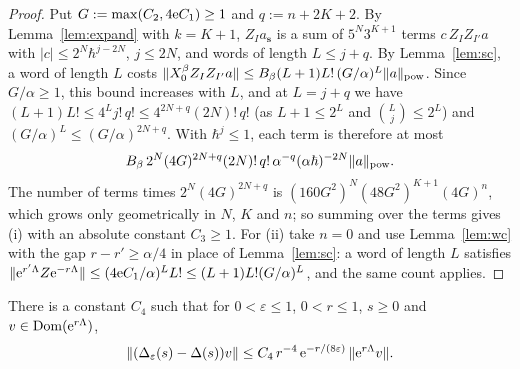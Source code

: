 \begin{proof}
Put $G:=\max(C_2,4\mathrm{e} C_1)\ge1$ and $q:=n+2K+2$. By Lemma~\ref{lem:expand} with $k=K+1$, $Z_Ia_{\mathbf s}$ is a sum of
$5^N3^{K+1}$ terms $c\,Z_IZ_{I'}a$ with $|c|\le2^N\hbar^{j-2N}$, $j\le2N$, and words of length $L\le j+q$. By Lemma~\ref{lem:sc}, a word
of length $L$ costs $\lVert X_0^\beta Z_IZ_{I'}a\rVert\le B_\beta(L+1)L!\,(G/\alpha)^L\lVert a\rVert_{\mathrm{pow}}$. Since $G/\alpha\ge1$, this bound increases with
$L$, and at $L=j+q$ we have $(L+1)L!\le4^Lj!\,q!\le4^{2N+q}(2N)!\,q!$ (as $L+1\le2^L$ and $\binom Lj\le2^L$) and
$(G/\alpha)^L\le(G/\alpha)^{2N+q}$. With $\hbar^j\le1$, each term is therefore at most
\[
B_\beta\,2^N(4G)^{2N+q}(2N)!\,q!\,\alpha^{-q}(\alpha\hbar)^{-2N}\lVert a\rVert_{\mathrm{pow}} .
\]
The number of terms times $2^N(4G)^{2N+q}$ is $(160G^2)^N(48G^2)^{K+1}(4G)^n$, which grows only geometrically in $N$, $K$ and $n$; so
summing over the terms gives (i) with an absolute constant $C_3\ge1$.
For (ii) take $n=0$ and use Lemma~\ref{lem:wc} with the gap $r-r'\ge\alpha/4$ in place of Lemma~\ref{lem:sc}: a word of length $L$
satisfies $\lVert \mathrm{e}^{r'\Lambda}Z\mathrm{e}^{-r\Lambda}\rVert\le(4\mathrm{e} C_1/\alpha)^LL!\le(L+1)L!(G/\alpha)^L$, and the same count applies. \qedhere
\end{proof}

\begin{lemma}\label{lem:unw}
There is a constant $C_4$ such that for $0<\varepsilon\le1$, $0<r\le1$, $s\ge0$ and $v\in\operatorname{Dom}(\mathrm{e}^{r\Lambda})$,
\[
\lVert (\Delta_\varepsilon(s)-\Delta(s))v\rVert\le C_4\,r^{-4}\,\mathrm{e}^{-r/(8\varepsilon)}\,\lVert \mathrm{e}^{r\Lambda}v\rVert.
\]
\end{lemma}

